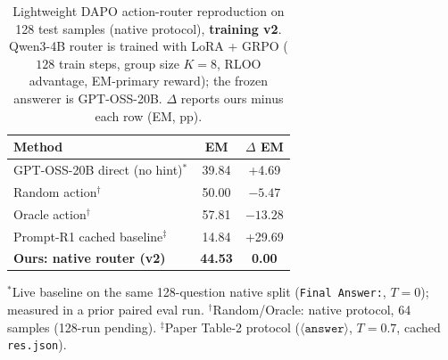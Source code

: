 \begin{table}[t]
\centering
\small
\setlength{\tabcolsep}{4pt}
\caption{Lightweight DAPO action-router reproduction on 128 test samples (native protocol), \textbf{training v2}.
Qwen3-4B router is trained with LoRA + GRPO ($128$ train steps, group size $K{=}8$, RLOO advantage, EM-primary reward);
the frozen answerer is GPT-OSS-20B.
$\Delta$ reports ours minus each row (EM, pp).}
\label{tab:dapo-router-native-v2}
\begin{tabular}{lcc}
\toprule
\textbf{Method} & \textbf{EM} & \textbf{$\Delta$ EM} \\
\midrule
GPT-OSS-20B direct (no hint)$^\ast$   & 39.84 & \textcolor{green!60!black}{+4.69} \\
Random action$^\dagger$              & 50.00 & \textcolor{red!70!black}{$-5.47$} \\
Oracle action$^\dagger$              & 57.81 & \textcolor{red!70!black}{$-13.28$} \\
Prompt-R1 cached baseline$^\ddagger$  & 14.84 & \textcolor{green!60!black}{+29.69} \\
\midrule
\textbf{Ours: native router (v2)}     & \textbf{44.53} & \textbf{0.00} \\
\bottomrule
\end{tabular}

\vspace{0.25em}
{\scriptsize
$^\ast$Live baseline on the same 128-question native split (\texttt{Final Answer:}, $T{=}0$); measured in a prior paired eval run.
$^\dagger$Random/Oracle: native protocol, 64 samples (128-run pending).
$^\ddagger$Paper Table-2 protocol ($\langle\texttt{answer}\rangle$, $T{=}0.7$, cached \texttt{res.json}).
}
\end{table}

